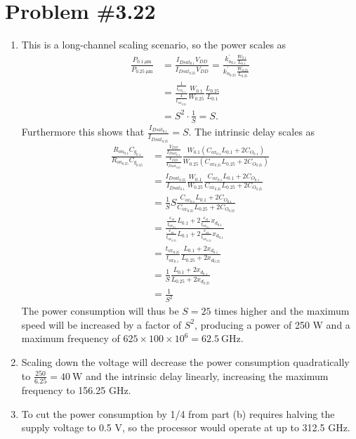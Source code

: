 \documentclass{article}
\begin{document}
\section*{Problem \#3.22}
\begin{enumerate}[label=(\alph*)]
  \item{
    This is a long-channel scaling scenario, so the power scales as
    \begin{align*}
       \frac{P_{0.1 ~\mu\mathrm{m}}}{P_{0.25 ~\mu\mathrm{m}}}
    &= \frac{I_{Dsat_{0.1}} V_{DD}}{I_{Dsat_{0.25}} V_{DD}}
     = \frac{k_{n_{0.1}}^\prime \frac{W_{0.1}}{L_{0.1}}}
            {k_{n_{0.25}}^\prime \frac{W_{0.25}}{L_{0.25}}} \\
    &= \frac{\frac{1}{t_{ox_{0.1}}}}
            {\frac{1}{t_{ox_{0.25}}}}
       \frac{W_{0.1}}{W_{0.25}}
       \frac{L_{0.25}}{L_{0.1}} \\
    &= S^2 \cdot \frac{1}{S}
     = S.
    \end{align*}
    Furthermore this shows that $\frac{I_{Dsat_{0.1}}}{I_{Dsat_{0.25}}} = S$.
    The intrinsic delay scales as
    \begin{align*}
       \frac{R_{on_{0.1}}  C_{g_{0.1}}}
            {R_{on_{0.25}} C_{g_{0.25}}}
    &= \frac{\frac{V_{DD}}{I_{Dsat_{0.1}}}}
            {\frac{V_{DD}}{I_{Dsat_{0.25}}}}
       \frac{W_{0.1}(C_{ox_{0.1}} L_{0.1} + 2C_{O_{0.1}})}
            {W_{0.25}(C_{ox_{0.25}} L_{0.25} + 2C_{O_{0.25}})} \\
    &= \frac{I_{Dsat_{0.25}}}{I_{Dsat_{0.1}}}
       \frac{W_{0.1}}{W_{0.25}}
       \frac{C_{ox_{0.1}} L_{0.1} + 2C_{O_{0.1}}}
            {C_{ox_{0.25}} L_{0.25} + 2C_{O_{0.25}}} \\
    &= \frac{1}{S} S
       \frac{C_{ox_{0.1}} L_{0.1} + 2C_{O_{0.1}}}
            {C_{ox_{0.25}} L_{0.25} + 2C_{O_{0.25}}} \\
    &= \frac{
         \frac{\varepsilon_{si}}{t_{ox_{0.1}}} L_{0.1}
       + 2 \frac{\varepsilon_{si}}{t_{ox_{0.1}}} x_{d_{0.1}}
       }
       {
         \frac{\varepsilon_{si}}{t_{ox_{0.25}}} L_{0.1}
         + 2 \frac{\varepsilon_{si}}{t_{ox_{0.25}}} x_{d_{0.1}}
       } \\
     &= \frac{t_{ox_{0.25}}}{t_{ox_{0.1}}}
        \frac{L_{0.1} + 2 x_{d_{0.1}}}
             {L_{0.25} + 2 x_{d_{0.25}}} \\
    &= \frac{1}{S} \frac{L_{0.1} + 2 x_{d_{0.1}}}
                        {L_{0.25} + 2 x_{d_{0.25}}} \\
    &= \frac{1}{S^2}
    \end{align*}
    The power consumption will thus be $S = 25$ times higher
    and the maximum speed will be increased by a factor of $S^2$,
    producing a power of 250 W and a maximum frequency of
    $625 \times 100 \times 10^6 = 62.5 ~\mathrm{GHz}$.
  }
  \item{
    Scaling down the voltage will decrease the power consumption
    quadratically to $\frac{250}{6.25} = 40~\mathrm{W}$ and the
    intrinsic delay linearly, increasing the maximum frequency
    to 156.25 GHz.
  }
  \item{
    To cut the power consumption by 1/4 from part (b) requires
    halving the supply voltage to 0.5 V, so the processor would
    operate at up to 312.5 GHz.
  }
\end{enumerate}
\end{document}
